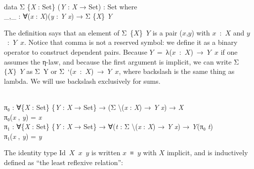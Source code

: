 \documentclass{entcs} \usepackage{prentcsmacro}
\newcommand{\AgdaC}[1]{\mbox{#1}}
\newcommand{\AgdaFontStyle}[1]{\textsf{#1}}
\newcommand{\AgdaBoundFontStyle}[1]{\textit{#1}}
\newcommand{\AgdaKeyword}     [1]
    {\AgdaFontStyle{\textcolor{AgdaKeyword}{#1}}}
\newcommand{\AgdaSymbol}      [1]{\textcolor{AgdaSymbol}{#1}}
\newcommand{\AgdaPrimitiveType}[1]
    {\AgdaFontStyle{\textcolor{AgdaPrimitiveType}{#1}}}
\newcommand{\AgdaBound}    [1]{\AgdaBoundFontStyle{\textcolor{AgdaBound}{#1}}}
\newcommand{\AgdaInductiveConstructor}[1]
    {\AgdaFontStyle{\textcolor{AgdaInductiveConstructor}{#1}}}
\newcommand{\AgdaDatatype} [1]{\AgdaFontStyle{\textcolor{AgdaDatatype}{#1}}}
\newcommand{\AgdaFunction} [1]{\AgdaFontStyle{\textcolor{AgdaFunction}{#1}}}
\newcommand{\AgdaIndent}[1]{\quad}
\newcommand{\AgdaCodeStyle}{\small}
\newenvironment{code}%
{\noindent\AgdaCodeStyle\pboxed}%
{\endpboxed\par\noindent%
\ignorespacesafterend}
\begin{document}
\begin{code}\>\<%
\\
\>\AgdaKeyword{data} \AgdaDatatype{Σ} \AgdaSymbol{\{}\AgdaBound{X} \AgdaSymbol{:} \AgdaPrimitiveType{Set}\AgdaSymbol{\}} \AgdaSymbol{(}\AgdaBound{Y} \AgdaSymbol{:} \AgdaBound{X} \AgdaSymbol{→} \AgdaPrimitiveType{Set}\AgdaSymbol{)} \AgdaSymbol{:} \AgdaPrimitiveType{Set} \AgdaKeyword{where}\<%
\\
\>[0]\AgdaIndent{2}{}\<[2]%
\>[2]\AgdaInductiveConstructor{\_,\_} \AgdaSymbol{:} \AgdaSymbol{∀(}\AgdaBound{x} \AgdaSymbol{:} \AgdaBound{X}\AgdaSymbol{)(}\AgdaBound{y} \AgdaSymbol{:} \AgdaBound{Y} \AgdaBound{x}\AgdaSymbol{)} \AgdaSymbol{→} \AgdaDatatype{Σ} \AgdaSymbol{\{}\AgdaBound{X}\AgdaSymbol{\}} \AgdaBound{Y}\<%
\\
\>\<\end{code}
The definition says that an element of \AgdaC{Σ \{$X$\} $Y$} is a pair
\AgdaC{($x$,$y$)} with \AgdaC{$x$ : $X$} and \AgdaC{$y$ : $Y$ $x$}.
Notice that comma is not a reserved symbol: we define it as a binary
operator to construct dependent pairs.  Because \AgdaC{$Y$ = λ($x$ : $X$) →
$Y$ $x$} if one assumes the η-law, and because the first argument is
implicit, we can write \AgdaC{Σ $\{X\}$ $Y$} as \AgdaC{Σ Y} or \AgdaC{Σ
\char`\\($x$ : $X$) → $Y$ $x$}, where backslash is the same thing as
lambda. We will use backslash exclusively for sums. 

\begin{code}\>\<%
\\
\>\AgdaFunction{π₀} \AgdaSymbol{:} \AgdaSymbol{∀\{}\AgdaBound{X} \AgdaSymbol{:} \AgdaPrimitiveType{Set}\AgdaSymbol{\}} \AgdaSymbol{\{}\AgdaBound{Y} \AgdaSymbol{:} \AgdaBound{X} \AgdaSymbol{→} \AgdaPrimitiveType{Set}\AgdaSymbol{\}} \AgdaSymbol{→} \AgdaSymbol{(}\AgdaDatatype{Σ} \AgdaSymbol{	\textbackslash(}\AgdaBound{x} \AgdaSymbol{:} \AgdaBound{X}\AgdaSymbol{)} \AgdaSymbol{→} \AgdaBound{Y} \AgdaBound{x}\AgdaSymbol{)} \AgdaSymbol{→} \AgdaBound{X}\<%
\\
\>\AgdaFunction{π₀}\AgdaSymbol{(}\AgdaBound{x} \AgdaInductiveConstructor{,} \AgdaBound{y}\AgdaSymbol{)} \AgdaSymbol{=} \AgdaBound{x}\<%
\\
\>\AgdaFunction{π₁} \AgdaSymbol{:} \AgdaSymbol{∀\{}\AgdaBound{X} \AgdaSymbol{:} \AgdaPrimitiveType{Set}\AgdaSymbol{\}} \AgdaSymbol{\{}\AgdaBound{Y} \AgdaSymbol{:} \AgdaBound{X} \AgdaSymbol{→} \AgdaPrimitiveType{Set}\AgdaSymbol{\}} \AgdaSymbol{→} \AgdaSymbol{∀(}\AgdaBound{t} \AgdaSymbol{:} \AgdaDatatype{Σ} \AgdaSymbol{	\textbackslash(}\AgdaBound{x} \AgdaSymbol{:} \AgdaBound{X}\AgdaSymbol{)} \AgdaSymbol{→} \AgdaBound{Y} \AgdaBound{x}\AgdaSymbol{)} \AgdaSymbol{→} \AgdaBound{Y}\AgdaSymbol{(}\AgdaFunction{π₀} \AgdaBound{t}\AgdaSymbol{)}\<%
\\
\>\AgdaFunction{π₁}\AgdaSymbol{(}\AgdaBound{x} \AgdaInductiveConstructor{,} \AgdaBound{y}\AgdaSymbol{)} \AgdaSymbol{=} \AgdaBound{y}\<%
\\
\>\<\end{code}
The identity type \AgdaC{Id $X$ $x$ $y$} is written
\AgdaC{$x$ ≡ $y$} with \AgdaC{$X$} implicit, and is inductively
defined as ``the least reflexive relation'':
\end{document}
